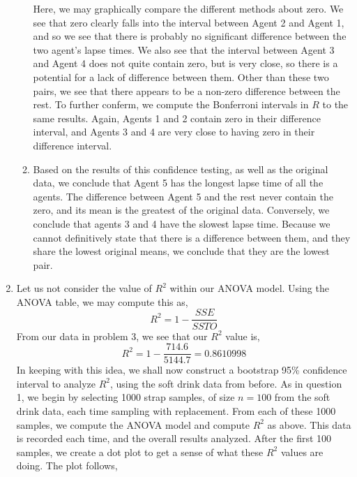 \documentclass[letterpaper,10pt]{article}
\begin{document}
\begin{enumerate}
\begin{enumerate}
\begin{center}
\end{center}
Here, we may graphically compare the different methods about zero. We see that zero clearly falls into the interval between Agent 2 and Agent 1, and so we see that there is probably no significant difference between the two agent's lapse times. We also see that the interval between Agent 3 and Agent 4 does not quite contain zero, but is very close, so there is a potential for a lack of difference between them. Other than these two pairs, we see that there appears to be a non-zero difference between the rest. To further conferm, we compute the Bonferroni intervals in $R$ to the same results. Again, Agents 1 and 2 contain zero in their difference interval, and Agents 3 and 4 are very close to having zero in their difference interval.
\item Based on the results of this confidence testing, as well as the original data, we conclude that Agent 5 has the longest lapse time of all the agents. The difference between Agent 5 and the rest never contain the zero, and its mean is the greatest of the original data. Conversely, we conclude that agents 3 and 4 have the slowest lapse time. Because we cannot definitively state that there is a difference between them, and they share the lowest original means, we conclude that they are the lowest pair.
\end{enumerate}
\item Let us not consider the value of $R^2$ within our ANOVA model. Using the ANOVA table, we may compute this as,
\[R^2=1-\frac{SSE}{SSTO}\]
From our data in problem 3, we see that our $R^2$ value is,
\[R^2=1-\frac{714.6}{5144.7}=0.8610998\]
In keeping with this idea, we shall now construct a bootstrap 95\% confidence interval to analyze $R^2$, using the soft drink data from before. As in question 1, we begin by selecting 1000 strap samples, of size $n=100$ from the soft drink data, each time sampling with replacement. From each of these 1000 samples, we compute the ANOVA model and compute $R^2$ as above. This data is recorded each time, and the overall results analyzed. After the first 100 samples, we create a dot plot to get a sense of what these $R^2$ values are doing. The plot follows,
\begin{center}

\end{center}
\end{enumerate}
\end{document}
